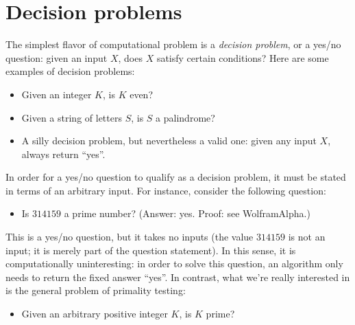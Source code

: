 



\section{Decision problems}

The simplest flavor of computational problem is a \emph{decision problem}, or a
yes/no question: given an input \(X\), does \(X\) satisfy certain conditions?
Here are some examples of decision problems:
\begin{itemize}[nosep]
  \item Given an integer \(K\), is \(K\) even?
  \item Given a string of letters \(S\), is \(S\) a palindrome?
  \item A silly decision problem, but nevertheless a valid one: given any input
    \(X\), always return ``yes''.
\end{itemize}

In order for a yes/no question to qualify as a decision problem, it must be
stated in terms of an arbitrary input.  For instance, consider the following
question:
\begin{itemize}[nosep]
  \item Is \(314159\) a prime number?  (Answer: yes.  Proof: see WolframAlpha.)
\end{itemize}
This is a yes/no question, but it takes no inputs (the value \(314159\) is not
an input; it is merely part of the question statement).  In this sense, it is
computationally uninteresting: in order to solve this question, an algorithm
only needs to return the fixed answer ``yes''.  In contrast, what we're really
interested in is the general problem of primality testing:
\begin{itemize}[nosep]
  \item Given an arbitrary positive integer \(K\), is \(K\) prime?
\end{itemize}

